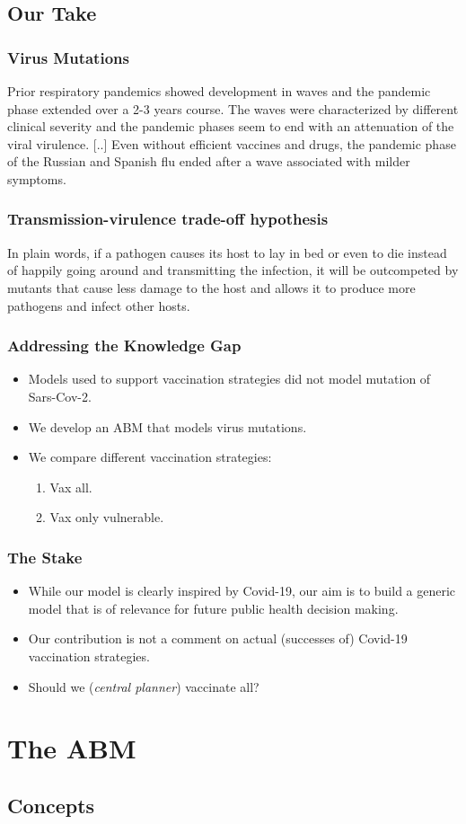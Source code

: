 \documentclass{beamer}%
\newcommand{\ijg}{\item\justifying}
\newcommand{\benum}{\begin{enumerate}}
\newcommand{\eenum}{\end{enumerate}}
\newcommand{\bit}{\begin{itemize}}
\newcommand{\eit}{\end{itemize}}
\begin{document}
\subsection{Our Take}
\begin{frame}
\frametitle{Virus Mutations}
 Prior respiratory pandemics showed development in waves and the pandemic phase extended over a 2-3 years course. The waves were characterized by different clinical severity and the pandemic phases seem to end with an attenuation of the viral virulence. [..] Even without efficient vaccines and drugs, the pandemic phase of the Russian and Spanish flu ended after a wave associated with milder symptoms. \cite[P.\ 1314]{Bruessow2022}
\end{frame}

\begin{frame}
\frametitle{Transmission-virulence trade-off hypothesis}
In plain words, if a pathogen causes its host to lay in bed or even to die instead of happily going around and transmitting the infection, it will be outcompeted by mutants that cause less damage to the host and allows it to produce more pathogens and infect other hosts. \cite[P.\ 71]{Kun2023} 
\end{frame}

\begin{frame}
\frametitle{Addressing the Knowledge Gap}
\begin{itemize}
\ijg Models used to support vaccination strategies did not model mutation of Sars-Cov-2.
\ijg We develop an ABM that models virus mutations.
\ijg We compare different vaccination strategies:
\benum
\ijg Vax all.
\ijg Vax only vulnerable.
\eenum
\end{itemize}
\end{frame}

\begin{frame}
\frametitle{The Stake}
\bit
\ijg While our model is clearly inspired by Covid-19, our aim is to build a generic model that is of relevance for future public health decision making.
\ijg Our contribution is not a comment on actual (successes of) Covid-19 vaccination strategies.
\ijg Should we (\emph{central planner}) vaccinate all?
\eit
\end{frame}

\section{The ABM}
\subsection{Concepts}
\end{document}
